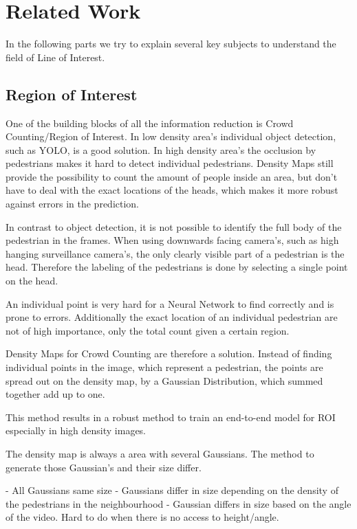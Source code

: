 \chapter{Related Work}
In the following parts we try to explain several key subjects to understand the field of Line of Interest.

\section{Region of Interest}
One of the building blocks of all the information reduction is Crowd Counting/Region of Interest. In low density area's individual object detection, such as YOLO, is a good solution. In high density area's the occlusion by pedestrians makes it hard to detect individual pedestrians. Density Maps still provide the possibility to count the amount of people inside an area, but don't have to deal with the exact locations of the heads, which makes it more robust against errors in the prediction.

In contrast to object detection, it is not possible to identify the full body of the pedestrian in the frames. When using downwards facing camera's, such as high hanging surveillance camera's, the only clearly visible part of a pedestrian is the head. Therefore the labeling of the pedestrians is done by selecting a single point on the head.

An individual point is very hard for a Neural Network to find correctly and is prone to errors. Additionally the exact location of an individual pedestrian are not of high importance, only the total count given a certain region.

Density Maps for Crowd Counting are therefore a solution. Instead of finding individual points in the image, which represent a pedestrian, the points are spread out on the density map, by a Gaussian Distribution, which summed together add up to one.

This method results in a robust method to train an end-to-end model for ROI especially in high density images.


The density map is always a area with several Gaussians. The method to generate those Gaussian's and their size differ.

- All Gaussians same size
- Gaussians differ in size depending on the density of the pedestrians in the neighbourhood
- Gaussian differs in size based on the angle of the video. Hard to do when there is no access to height/angle.

